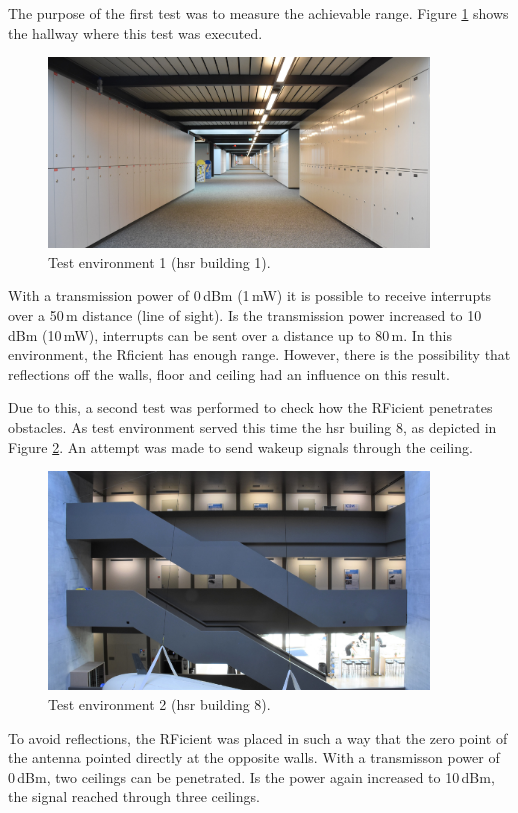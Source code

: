 The purpose of the first test was to measure the achievable range.
Figure \ref{development:env1} shows the hallway where this test was executed.
\begin{figure}[ht]
	\centering
	\includegraphics[width=0.9\textwidth]{4-development/hardware/graphics/env/env1_c.pdf}
	\caption{Test environment 1 (\acs{hsr} building 1).\label{development:env1}}
\end{figure}
With a transmission power of 0\,dBm (1\,mW) it is possible to receive interrupts over a 50\,m distance (line of sight).
Is the transmission power increased to 10\,dBm (10\,mW), interrupts can be sent over a distance up to 80\,m.
In this environment, the Rficient has enough range.
However, there is the possibility that reflections off the walls, floor and ceiling had an influence on this result.

Due to this, a second test was performed to check how the RFicient penetrates obstacles.
As test environment served this time the \acs{hsr} builing 8, as depicted in Figure \ref{development:env2}.
An attempt was made to send wakeup signals through the ceiling.
\begin{figure}[ht]
	\centering
	\includegraphics[width=0.9\textwidth]{4-development/hardware/graphics/env/env2_c.pdf}
	\caption{Test environment 2 (\acs{hsr} building 8).\label{development:env2}}
\end{figure}
To avoid reflections, the RFicient was placed in such a way that the zero point of the antenna pointed directly at the opposite walls.
With a transmisson power of 0\,dBm, two ceilings can be penetrated.
Is the power again increased to 10\,dBm, the signal reached through three ceilings.

